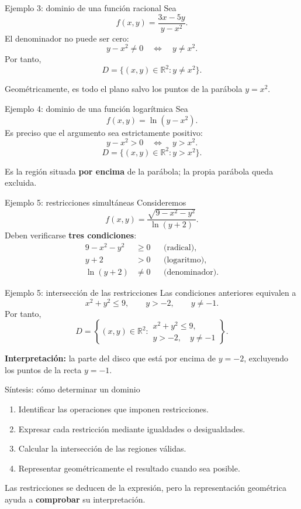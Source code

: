 \documentclass[main.tex]{subfiles}
\begin{document}
\begin{frame}{Ejemplo 3: dominio de una función racional}
Sea
\[
f(x,y)=\frac{3x-5y}{y-x^2}.
\]
El denominador no puede ser cero:
\[
y-x^2\ne0 \quad\Longleftrightarrow\quad y\ne x^2.
\]
Por tanto,
\[
\boxed{D=\{(x,y)\in\mathbb R^2:y\ne x^2\}.}
\]
\medskip

Geométricamente, es todo el plano salvo los puntos de la parábola $y=x^2$.
\end{frame}

\begin{frame}{Ejemplo 4: dominio de una función logarítmica}
Sea
\[
f(x,y)=\ln(y-x^2).
\]
Es preciso que el argumento sea estrictamente positivo:
\[
y-x^2>0 \quad\Longleftrightarrow\quad y>x^2.
\]
\[
\boxed{D=\{(x,y)\in\mathbb R^2:y>x^2\}.}
\]
\medskip

Es la región situada \textbf{por encima} de la parábola; la propia parábola queda excluida.
\end{frame}

\begin{frame}{Ejemplo 5: restricciones simultáneas}
Consideremos
\[
f(x,y)=\frac{\sqrt{9-x^2-y^2}}{\ln(y+2)}.
\]
Deben verificarse \textbf{tres condiciones}:
\begin{align*}
9-x^2-y^2&\geq0 &&\text{(radical)},\\
y+2&>0 &&\text{(logaritmo)},\\
\ln(y+2)&\ne0 &&\text{(denominador)}.
\end{align*}
\end{frame}

\begin{frame}{Ejemplo 5: intersección de las restricciones}
Las condiciones anteriores equivalen a
\[
x^2+y^2\leq9,\qquad y>-2,\qquad y\ne-1.
\]
Por tanto,
\[
\boxed{D=\left\{(x,y)\in\mathbb R^2:
\begin{array}{l}
x^2+y^2\leq9,\\
y>-2,\quad y\ne-1
\end{array}\right\}.}
\]
\medskip

\textbf{Interpretación:} la parte del disco que está por encima de $y=-2$, excluyendo los puntos de la recta $y=-1$.
\end{frame}

\begin{frame}{Síntesis: cómo determinar un dominio}
\begin{enumerate}
  \item Identificar las operaciones que imponen restricciones.
  \medskip
  \item Expresar cada restricción mediante igualdades o desigualdades.
  \medskip
  \item Calcular la intersección de las regiones válidas.
  \medskip
  \item Representar geométricamente el resultado cuando sea posible.
\end{enumerate}
\medskip

Las restricciones se deducen de la expresión, pero la representación geométrica ayuda a \textbf{comprobar} su interpretación.
\end{frame}
\end{document}
